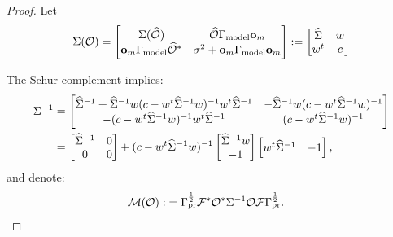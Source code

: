 \begin{proof}
  Let
  \begin{align*}
    \Sigma( \mathcal{O} ) &= 
    \begin{bmatrix}
      \Sigma (\widehat{\mathcal{O}} )           & \widehat{\mathcal{O}} \Gamma_{\textup{model}} \mathbf{o}_m \\
      \mathbf{o}_m \Gamma_{\textup{model}} \widehat{\mathcal{O}}^*   & \sigma^2 + \mathbf{o}_m \Gamma_{\textup{model}} \mathbf{o}_m
    \end{bmatrix}
    : =
    \begin{bmatrix}
      \widehat{\Sigma}   & w \\
      w^t       & c
    \end{bmatrix}\\
  \end{align*}

  The Schur complement implies:
  \begin{align}\label{eq:schur}
    \begin{split}
          \Sigma^{-1} &=
          \begin{bmatrix}
            \widehat{\Sigma}^{-1} + \widehat{\Sigma}^{-1} w ( c - w^t \widehat{\Sigma}^{-1} w)^{-1} w^t \widehat{\Sigma}^{-1} & - \widehat{\Sigma}^{-1} w ( c - w^t \widehat{\Sigma}^{-1} w)^{-1} \\
            -( c - w^t \widehat{\Sigma}^{-1} w)^{-1} w^t \widehat{\Sigma}^{-1}                            &  ( c - w^t \widehat{\Sigma}^{-1} w)^{-1}
          \end{bmatrix} \\
          &=
          \begin{bmatrix}
            \widehat{\Sigma}^{-1} & 0 \\
            0           & 0 
          \end{bmatrix}
          + (c -w^t \widehat{\Sigma}^{-1} w )^{-1}
          \begin{bmatrix}
            \widehat{\Sigma}^{-1} w \\
            -1
          \end{bmatrix}
          \begin{bmatrix}
            w^t \widehat{\Sigma}^{-1} & -1 
          \end{bmatrix},
    \end{split}
  \end{align}
  and denote:
  \begin{align}\label{eq:M def}
    \mathcal{M} (\mathcal{O} ):&= \Gamma_{\textup{pr}}^{\frac12}\mathcal{F}^* \mathcal{O}^* \Sigma^{-1} \mathcal{O} \mathcal{F}
    \Gamma_{\textup{pr}}^{\frac12}.
  \end{align}
  

\end{proof}
